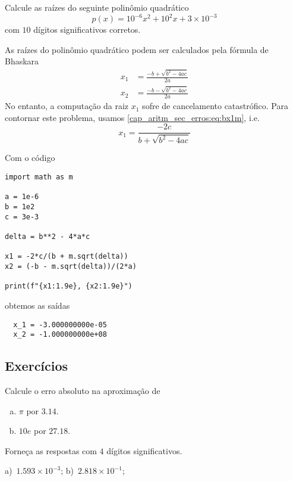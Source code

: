 \begin{exeresol}
  Calcule as raízes do seguinte polinômio quadrático
  \begin{equation}
    p(x) = 10^{-6}x^2 + 10^2x + 3\times 10^{-3}
  \end{equation}
  com $10$ dígitos significativos corretos.
\end{exeresol}
\begin{resol}
  As raízes do polinômio quadrático podem ser calculados pela fórmula de Bhaskara
  \begin{align}
    x_1 &= \frac{-b + \sqrt{b^2 - 4ac}}{2a}\label{cap_aritm_sec_erros:eq:bx1}\\
    x_2 &= \frac{-b - \sqrt{b^2 - 4ac}}{2a}
  \end{align}
  No entanto, a computação da raiz $x_1$ sofre de cancelamento catastrófico. Para contornar este problema, usamos \eqref{cap_aritm_sec_erros:eq:bx1m}, i.e.
  \begin{equation}
    x_1 = \frac{-2c}{b + \sqrt{b^2 - 4ac}}
  \end{equation}

  
  Com o código

\begin{lstlisting}
import math as m

a = 1e-6
b = 1e2
c = 3e-3

delta = b**2 - 4*a*c

x1 = -2*c/(b + m.sqrt(delta))
x2 = (-b - m.sqrt(delta))/(2*a)

print(f"{x1:1.9e}, {x2:1.9e}")
\end{lstlisting}

obtemos as saídas

\begin{verbatim}
  x_1 = -3.000000000e-05
  x_2 = -1.000000000e+08
\end{verbatim}
  
\end{resol}

\subsection{Exercícios}

\begin{exer}\label{exer:erro_abs}
  Calcule o erro absoluto na aproximação de
  \begin{enumerate}[a)]
  \item $\pi$ por $3.14$.
  \item $10e$ por $27.18$.
  \end{enumerate}
  Forneça as respostas com $4$ dígitos significativos.
\end{exer}
\begin{resp}
  a)~$1.593\times 10^{-3}$; b)~$2.818\times 10^{-1}$;
\end{resp}

